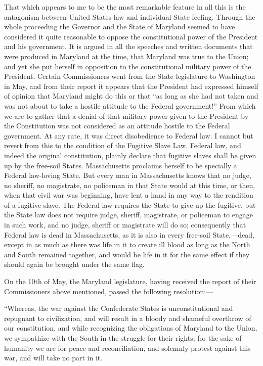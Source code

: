 That which appears to me to be the most remarkable feature in all
this is the antagonism between United States law and individual
State feeling.  Through the whole proceeding the Governor and the
State of Maryland seemed to have considered it quite reasonable to
oppose the constitutional power of the President and his
government.  It is argued in all the speeches and written documents
that were produced in Maryland at the time, that Maryland was true
to the Union; and yet she put herself in opposition to the
constitutional military power of the President.  Certain
Commissioners went from the State legislature to Washington in May,
and from their report it appears that the President had expressed
himself of opinion that Maryland might do this or that ``as long as
she had not taken and was not about to take a hostile attitude to
the Federal government!''  From which we are to gather that a denial
of that military power given to the President by the Constitution
was not considered as an attitude hostile to the Federal
government.  At any rate, it was direct disobedience to Federal
law.  I cannot but revert from this to the condition of the
Fugitive Slave Law.  Federal law, and indeed the original
constitution, plainly declare that fugitive slaves shall be given
up by the free-soil States.  Massachusetts proclaims herself to be
specially a Federal law-loving State.  But every man in
Massachusetts knows that no judge, no sheriff, no magistrate, no
policeman in that State would at this time, or then, when that
civil war was beginning, have lent a hand in any way to the
rendition of a fugitive slave.  The Federal law requires the State
to give up the fugitive, but the State law does not require judge,
sheriff, magistrate, or policeman to engage in such work, and no
judge, sheriff or magistrate will do so; consequently that Federal
law is dead in Massachusetts, as it is also in every free-soil
State,---dead, except in as much as there was life in it to create
ill blood as long as the North and South remained together, and
would be life in it for the same effect if they should again be
brought under the same flag.

On the 10th of May, the Maryland legislature, having received the
report of their Commissioners above mentioned, passed the following
resolution:---%

``Whereas, the war against the Confederate States is
unconstitutional and repugnant to civilization, and will result in
a bloody and shameful overthrow of our constitution, and while
recognizing the obligations of Maryland to the Union, we sympathize
with the South in the struggle for their rights; for the sake of
humanity we are for peace and reconciliation, and solemnly protest
against this war, and will take no part in it.

